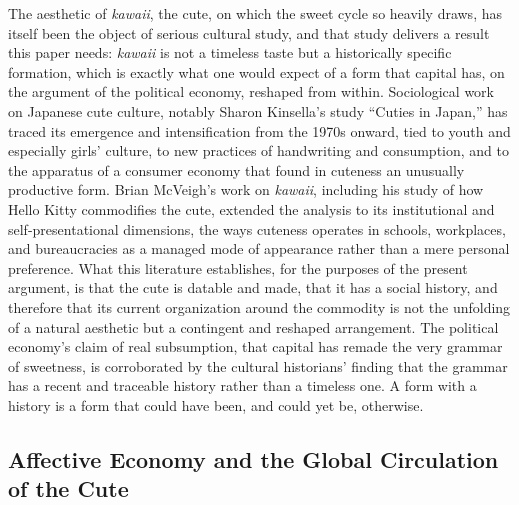 \documentclass[11pt,a4paper]{article}
\begin{document}
The aesthetic of \textit{kawaii}, the cute, on which the sweet cycle so heavily draws, has itself been the object of serious cultural study, and that study delivers a result this paper needs: \textit{kawaii} is not a timeless taste but a historically specific formation, which is exactly what one would expect of a form that capital has, on the argument of the political economy, reshaped from within. Sociological work on Japanese cute culture, notably Sharon Kinsella's study ``Cuties in Japan,'' has traced its emergence and intensification from the 1970s onward, tied to youth and especially girls' culture, to new practices of handwriting and consumption, and to the apparatus of a consumer economy that found in cuteness an unusually productive form. Brian McVeigh's work on \textit{kawaii}, including his study of how Hello Kitty commodifies the cute, extended the analysis to its institutional and self-presentational dimensions, the ways cuteness operates in schools, workplaces, and bureaucracies as a managed mode of appearance rather than a mere personal preference. What this literature establishes, for the purposes of the present argument, is that the cute is datable and made, that it has a social history, and therefore that its current organization around the commodity is not the unfolding of a natural aesthetic but a contingent and reshaped arrangement. The political economy's claim of real subsumption, that capital has remade the very grammar of sweetness, is corroborated by the cultural historians' finding that the grammar has a recent and traceable history rather than a timeless one. A form with a history is a form that could have been, and could yet be, otherwise.

\subsection{Affective Economy and the Global Circulation of the Cute}
\end{document}
